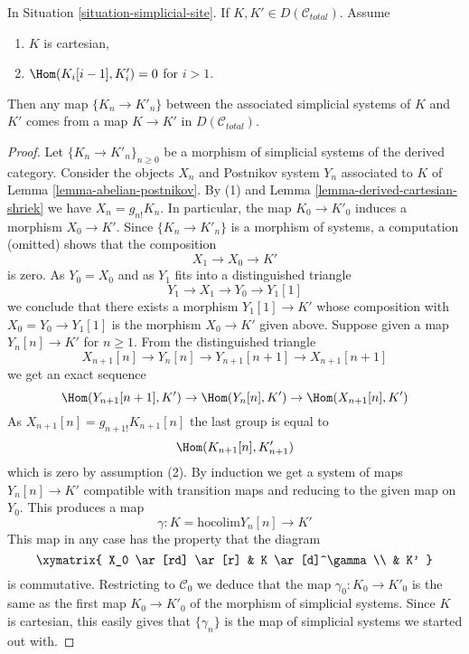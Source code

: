 \begin{lemma}
\label{lemma-hom-cartesian-objects-derived}
In Situation \ref{situation-simplicial-site}.
If $K, K' \in D(\mathcal{C}_{total})$.
Assume
\begin{enumerate}
\item $K$ is cartesian,
\item $\Hom(K_i[i - 1], K'_i) = 0$ for $i > 1$.
\end{enumerate}
Then any map $\{K_n \to K'_n\}$ between the associated simplicial systems 
of $K$ and $K'$ comes from a map $K \to K'$ in $D(\mathcal{C}_{total})$.
\end{lemma}

\begin{proof}
Let $\{K_n \to K'_n\}_{n \geq 0}$
be a morphism of simplicial systems of the derived category.
Consider the objects $X_n$ and Postnikov system $Y_n$
associated to $K$ of Lemma \ref{lemma-abelian-postnikov}.
By (1) and Lemma \ref{lemma-derived-cartesian-shriek} we have
$X_n = g_{n!}K_n$. In particular, the map $K_0 \to K'_0$
induces a morphism $X_0 \to K'$. Since $\{K_n \to K'_n\}$
is a morphism of systems, a computation (omitted) shows that
the composition
$$
X_1 \to X_0 \to K'
$$
is zero. As $Y_0 = X_0$ and as $Y_1$ fits into a distinguished
triangle
$$
Y_1 \to X_1 \to Y_0 \to Y_1[1]
$$
we conclude that there exists a morphism $Y_1[1] \to K'$ whose
composition with $X_0 = Y_0 \to Y_1[1]$ is the morphism $X_0 \to K'$
given above. Suppose given a map $Y_n[n] \to K'$ for $n \geq 1$.
From the distinguished triangle
$$
X_{n + 1}[n] \to Y_n[n] \to Y_{n + 1}[n + 1] \to X_{n + 1}[n + 1]
$$
we get an exact sequence
$$
\Hom(Y_{n + 1}[n + 1], K') \to
\Hom(Y_n[n], K') \to
\Hom(X_{n + 1}[n], K')
$$
As $X_{n + 1}[n] = g_{n + 1!}K_{n + 1}[n]$ the last group is equal to
$$
\Hom(K_{n + 1}[n], K'_{n + 1})
$$
which is zero by assumption (2). By induction we get a system of
maps $Y_n[n] \to K'$ compatible with transition maps and reducing
to the given map on $Y_0$. This produces a map
$$
\gamma :
K = \text{hocolim} Y_n[n]
\longrightarrow
K'
$$
This map in any case has the property that the diagram
$$
\xymatrix{
X_0 \ar[rd] \ar[r] &
K \ar[d]^\gamma \\
& K'
}
$$
is commutative. Restricting to
$\mathcal{C}_0$ we deduce that the map $\gamma_0 : K_0 \to K'_0$
is the same as the first map $K_0 \to K'_0$ of the morphism
of simplicial systems. Since $K$ is cartesian, this easily gives that
$\{\gamma_n\}$ is the map of simplicial systems we started out with.
\end{proof}


